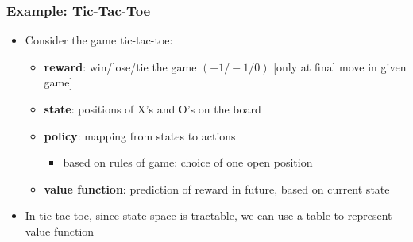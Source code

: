 \documentclass[handout]{beamer}
\renewcommand{\high}{\textbf}
\begin{document}
\begin{frame}\frametitle{Example: Tic-Tac-Toe}\small
\begin{itemize}
\item Consider the game tic-tac-toe:
\begin{itemize}
 \setlength\itemsep{1em}
\item \high{reward}:  win/lose/tie the game $(+1/-1/0)$ [only at final move in given game]
\item \high{state}: positions of X's and O's on the board
\item \high{policy}: mapping from states to actions 
\begin{itemize}
\item based on rules of game: choice of one open position
\end{itemize}
\item \high{value function}: prediction of reward in future, based    on current state
\end{itemize}
\item In tic-tac-toe, since state space is tractable, we can use a table to represent value function 
\end{itemize}
\end{frame}
\end{document}

